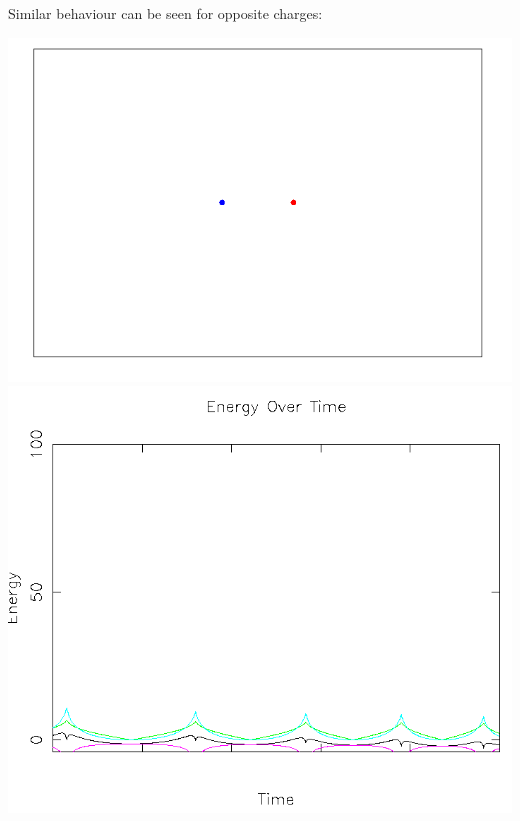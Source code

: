 \documentclass{article}
\begin{document}
Similar behaviour can be seen for opposite charges:
\\
\begin{center}
    \includegraphics[scale=0.5]{charged_2_opp}
    \includegraphics[scale=0.5]{charged_2_opp_energy}
\end{center}
\end{document}
